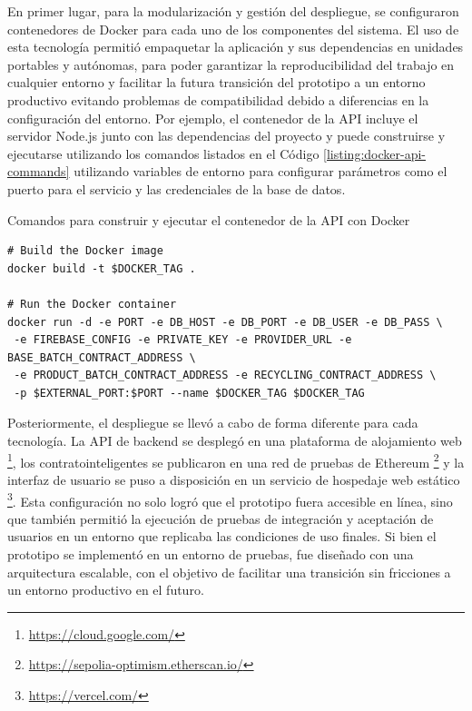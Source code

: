 En primer lugar, para la modularización y gestión del despliegue, se configuraron contenedores de Docker para cada uno de los componentes del sistema. El uso de esta tecnología permitió empaquetar la aplicación y sus dependencias en unidades portables y autónomas, para poder garantizar la reproducibilidad del trabajo en cualquier entorno y facilitar la futura transición del prototipo a un entorno productivo evitando problemas de compatibilidad debido a diferencias en la configuración del entorno. Por ejemplo, el contenedor de la API incluye el servidor Node.js junto con las dependencias del proyecto y puede construirse y ejecutarse utilizando los comandos listados en el Código \ref{listing:docker-api-commands} utilizando variables de entorno para configurar parámetros como el puerto para el servicio y las credenciales de la base de datos.

\begin{listing}[!htb]
\caption{Comandos para construir y ejecutar el contenedor de la API con Docker}
\label{listing:docker-api-commands}
\begin{verbatim}
# Build the Docker image
docker build -t $DOCKER_TAG .

# Run the Docker container
docker run -d -e PORT -e DB_HOST -e DB_PORT -e DB_USER -e DB_PASS \
 -e FIREBASE_CONFIG -e PRIVATE_KEY -e PROVIDER_URL -e BASE_BATCH_CONTRACT_ADDRESS \
 -e PRODUCT_BATCH_CONTRACT_ADDRESS -e RECYCLING_CONTRACT_ADDRESS \
 -p $EXTERNAL_PORT:$PORT --name $DOCKER_TAG $DOCKER_TAG
\end{verbatim}
\end{listing}


Posteriormente, el despliegue se llevó a cabo de forma diferente para cada tecnología. La API de \gls{backend} se desplegó en una plataforma de alojamiento web \footnote{\url{https://cloud.google.com/}}, los \glspl{contratointeligente} se publicaron en una red de pruebas de Ethereum \footnote{\url{https://sepolia-optimism.etherscan.io/}} y la interfaz de usuario se puso a disposición en un servicio de hospedaje web estático \footnote{\url{https://vercel.com/}}. Esta configuración no solo logró que el prototipo fuera accesible en línea, sino que también permitió la ejecución de pruebas de integración y aceptación de usuarios en un entorno que replicaba las condiciones de uso finales. Si bien el prototipo se implementó en un entorno de pruebas, fue diseñado con una arquitectura escalable, con el objetivo de facilitar una transición sin fricciones a un entorno productivo en el futuro.

